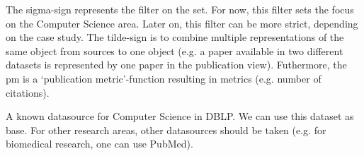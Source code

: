 \documentclass{ou-report}
\begin{document}
The sigma-sign represents the filter on the set. For now, this filter sets the 
focus on the Computer Science area. Later on, this filter can be more 
strict, depending on the case study.
The tilde-sign is to combine multiple representations of the same object from 
sources to one object (e.g. a paper available in two different datasets is 
represented by one paper in the publication view).
Futhermore, the pm is a `publication metric'-function resulting in metrics 
(e.g. number of citations).

A known datasource for Computer Science in DBLP. We can use this dataset as base.
For other research areas, other datasources should be taken (e.g. for 
biomedical research, one can use PubMed).

\end{document}
